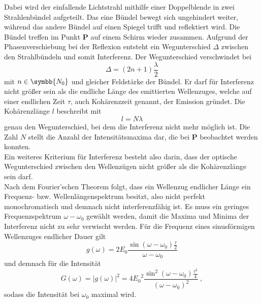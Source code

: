     Dabei wird der einfallende Lichtstrahl mithilfe einer Doppelblende in zwei Strahlenbündel aufgeteilt.
    Das eine Bündel bewegt sich ungehindert weiter,
    während das andere Bündel auf einen Spiegel trifft und reflektiert wird.
    Die Bündel treffen im Punkt \textbf{P} auf einem Schirm wieder zusammen.
    Aufgrund der Phasenverschiebung bei der Reflexion entsteht ein Wegunterschied $\Delta$ zwischen den Strahlbündeln
    und somit Interferenz.
    Der Wegunterschied verschwindet bei
    \begin{equation*}
        \Delta = (2n+1) \frac{\lambda}{2}
    \end{equation*}
    mit $n \in \symbb{N_0}$ und gleicher Feldstärke der Bündel.
    Er darf für Interferenz nicht größer sein als die endliche Länge des emittierten Wellenzuges,
    welche auf einer endlichen Zeit $\tau$,
    auch Kohärenzzeit genannt,
    der Emission gründet.
    Die Kohärenzlänge $l$ beschreibt mit
    \begin{equation*}
        l = N \lambda
    \end{equation*}
    genau den Wegunterschied,
    bei dem die Interferenz nicht mehr möglich ist.
    Die Zahl $N$ stellt die Anzahl der Intensitätsmaxima dar,
    die bei \textbf{P} beobachtet werden konnten.\\
    Ein weiteres Kriterium für Interferenz besteht also darin,
    dass der optische Wegunterschied zwischen den Wellenzügen nicht größer als die Kohärenzlänge sein darf.\\
    Nach dem Fourier'schen Theorem folgt,
    dass ein Wellenzug endlicher Länge ein Frequenz- bzw. Wellenlängenspektrum besitzt,
    also nicht perfekt monochromatisch und demnach nicht interferenzfähig ist.
    Es muss ein geringes Frequenzspektrum $\omega - \omega_0$ gewählt werden,
    damit die Maxima und Minima der Interferenz nicht zu sehr verwischt werden.
    Für die Frequenz eines sinusförmigen Wellenzuges endlicher Dauer gilt
    \begin{equation*}
        g(\omega) = 2 E_0 \frac{\sin(\omega - \omega_0) \frac{\tau}{2}}{\omega - \omega_0}
    \end{equation*}
    und demnach für die Intensität
    \begin{equation*}
        G(\omega) = \lvert g(\omega) \rvert ^2 = 4 {E_0}^2 \frac{\sin^2(\omega - \omega_0) \frac{{\tau}^2}{4}}{(\omega - \omega_0)^2} \ ,
    \end{equation*}
    sodass die Intensität bei $\omega_0$ maximal wird.

